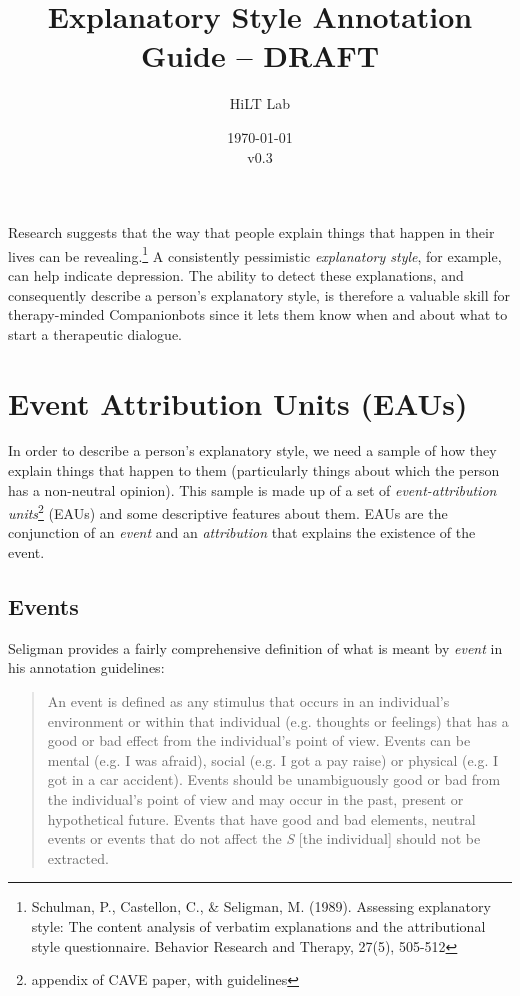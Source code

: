 \documentclass[a4paper,12pt]{article}
\begin{document}
\title{Explanatory Style Annotation Guide -- DRAFT}
\author{HiLT Lab}
\date{\today\\v0.3}
\maketitle

\tableofcontents
\break

Research suggests that the way that people explain things that happen in their lives can be revealing.\footnote{\label{seligman89}Schulman, P., Castellon, C., \& Seligman, M. (1989). Assessing explanatory style: The content analysis of verbatim explanations and the attributional style questionnaire. Behavior Research and Therapy, 27(5), 505-512} %
A consistently pessimistic \emph{explanatory style}, for example, can help indicate depression.
The ability to detect these explanations, and consequently describe a person's explanatory style, is therefore a valuable skill for therapy-minded Companionbots since it lets them know when and about what to start a therapeutic dialogue.

\section{Event Attribution Units (EAUs)}
In order to describe a person's explanatory style, we need a sample of how they explain things that happen to them (particularly things about which the person has a non-neutral opinion). %
This sample is made up of a set of \emph{event-attribution units}\footnote{\label{CAVE}appendix of CAVE paper, with guidelines} (EAUs) and some descriptive features about them. %
EAUs are the conjunction of an \emph{event} and an \emph{attribution} that explains the existence of the event.
 

\subsection{Events}

Seligman provides a fairly comprehensive definition of what is meant by \emph{event} in his annotation guidelines: %

\begin{quote}
    An event is defined as any stimulus that occurs in an individual's environment or within that individual (e.g. thoughts or feelings) that has a good or bad effect from the individual's point of view.
    Events can be mental (e.g. I was afraid), social (e.g. I got a pay raise) or physical (e.g. I got in a car accident).
    Events should be unambiguously good or bad from the individual's point of view and may occur in the past, present or hypothetical future.
    Events that have good and bad elements, neutral events or events that do not affect the \emph{S} [the individual] should not be extracted.
\end{quote}
\end{document}
